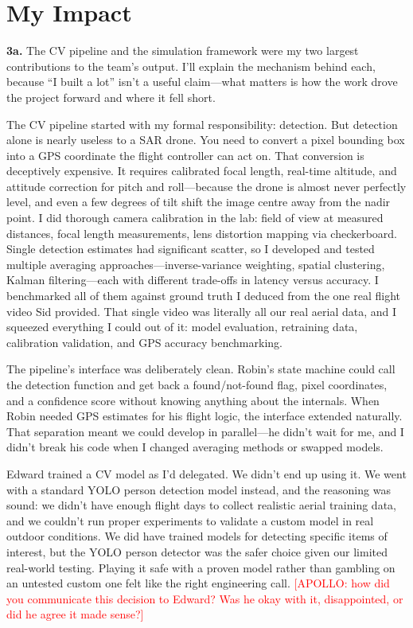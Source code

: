 \section{My Impact}

\textbf{3a.}
The CV pipeline and the simulation framework were my two largest contributions to the team's output. I'll explain the mechanism behind each, because ``I built a lot'' isn't a useful claim---what matters is how the work drove the project forward and where it fell short.

The CV pipeline started with my formal responsibility: detection. But detection alone is nearly useless to a SAR drone. You need to convert a pixel bounding box into a GPS coordinate the flight controller can act on. That conversion is deceptively expensive. It requires calibrated focal length, real-time altitude, and attitude correction for pitch and roll---because the drone is almost never perfectly level, and even a few degrees of tilt shift the image centre away from the nadir point. I did thorough camera calibration in the lab: field of view at measured distances, focal length measurements, lens distortion mapping via checkerboard. Single detection estimates had significant scatter, so I developed and tested multiple averaging approaches---inverse-variance weighting, spatial clustering, Kalman filtering---each with different trade-offs in latency versus accuracy. I benchmarked all of them against ground truth I deduced from the one real flight video Sid provided. That single video was literally all our real aerial data, and I squeezed everything I could out of it: model evaluation, retraining data, calibration validation, and GPS accuracy benchmarking.

The pipeline's interface was deliberately clean. Robin's state machine could call the detection function and get back a found/not-found flag, pixel coordinates, and a confidence score without knowing anything about the internals. When Robin needed GPS estimates for his flight logic, the interface extended naturally. That separation meant we could develop in parallel---he didn't wait for me, and I didn't break his code when I changed averaging methods or swapped models.

Edward trained a CV model as I'd delegated. We didn't end up using it. We went with a standard YOLO person detection model instead, and the reasoning was sound: we didn't have enough flight days to collect realistic aerial training data, and we couldn't run proper experiments to validate a custom model in real outdoor conditions. We did have trained models for detecting specific items of interest, but the YOLO person detector was the safer choice given our limited real-world testing. Playing it safe with a proven model rather than gambling on an untested custom one felt like the right engineering call. \textcolor{red}{[APOLLO: how did you communicate this decision to Edward? Was he okay with it, disappointed, or did he agree it made sense?]}


